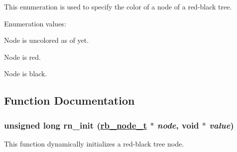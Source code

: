 This enumeration is used to specify the color of a node of a red-black tree. \begin{Desc}
\item[Enumeration values: ]\par
\begin{description}
\item[{\em 
\hypertarget{group__dbprim__rbtree_a38a137}{
RB\_\-COLOR\_\-NONE}
\label{group__dbprim__rbtree_a38a137}
}]Node is uncolored as of yet. \item[{\em 
\hypertarget{group__dbprim__rbtree_a38a138}{
RB\_\-COLOR\_\-RED}
\label{group__dbprim__rbtree_a38a138}
}]Node is red. \item[{\em 
\hypertarget{group__dbprim__rbtree_a38a139}{
RB\_\-COLOR\_\-BLACK}
\label{group__dbprim__rbtree_a38a139}
}]Node is black. \end{description}
\end{Desc}



\subsection{Function Documentation}
\hypertarget{group__dbprim__rbtree_a13}{
\subsubsection[rn\_\-init]{\setlength{\rightskip}{0pt plus 5cm}unsigned long rn\_\-init (\hyperlink{dbprim_8h_a1}{rb\_\-node\_\-t} $\ast$ {\em node}, void $\ast$ {\em value})}}
\label{group__dbprim__rbtree_a13}


This function dynamically initializes a red-black tree node.

